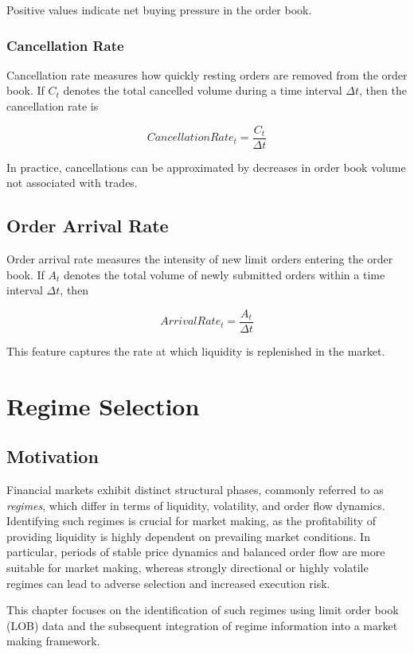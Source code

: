 \documentclass[12pt,a4paper]{report}
\begin{document}
Positive values indicate net buying pressure in the order book.

\subsection{Cancellation Rate}

Cancellation rate measures how quickly resting orders are removed from the order book. If $C_t$ denotes the total cancelled volume during a time interval $\Delta t$, then the cancellation rate is

\[
CancellationRate_t =
\frac{C_t}{\Delta t}
\]

In practice, cancellations can be approximated by decreases in order book volume not associated with trades.

\section{Order Arrival Rate}

Order arrival rate measures the intensity of new limit orders entering the order book. If $A_t$ denotes the total volume of newly submitted orders within a time interval $\Delta t$, then

\[
ArrivalRate_t =
\frac{A_t}{\Delta t}
\]

This feature captures the rate at which liquidity is replenished in the market.

\chapter{Regime Selection}

\section{Motivation}

Financial markets exhibit distinct structural phases, commonly referred to as \textit{regimes}, which differ in terms of liquidity, volatility, and order flow dynamics. Identifying such regimes is crucial for market making, as the profitability of providing liquidity is highly dependent on prevailing market conditions. In particular, periods of stable price dynamics and balanced order flow are more suitable for market making, whereas strongly directional or highly volatile regimes can lead to adverse selection and increased execution risk.

This chapter focuses on the identification of such regimes using limit order book (LOB) data and the subsequent integration of regime information into a market making framework.
\end{document}
